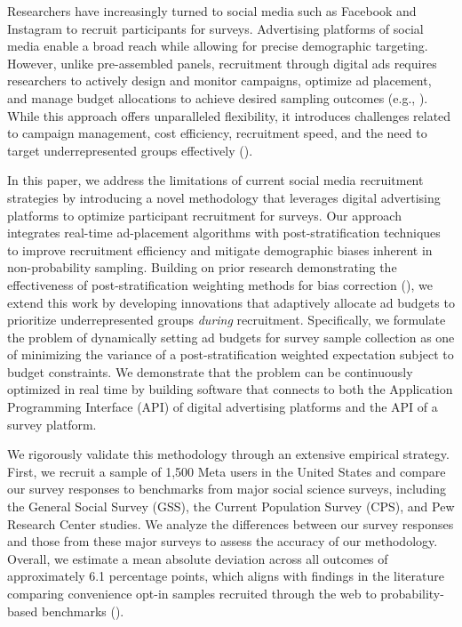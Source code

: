 Researchers have increasingly turned to social media such as Facebook and Instagram to recruit participants for surveys. Advertising platforms of social media enable a broad reach while allowing for precise demographic targeting. However, unlike pre-assembled panels, recruitment through digital ads requires researchers to actively design and monitor campaigns, optimize ad placement, and manage budget allocations to achieve desired sampling outcomes (e.g., \citealt{zhang2020quota}). While this approach offers unparalleled flexibility, it introduces challenges related to campaign management, cost efficiency, recruitment speed, and the need to target underrepresented groups effectively (\citealt{donati2024can, aridor2024experiments}).

In this paper, we address the limitations of current social media recruitment strategies by introducing a novel methodology that leverages digital advertising platforms to optimize participant recruitment for surveys. Our approach integrates real-time ad-placement algorithms with post-stratification techniques to improve recruitment efficiency and mitigate demographic biases inherent in non-probability sampling. Building on prior research demonstrating the effectiveness of post-stratification weighting methods for bias correction (\citealt{deville1992calibration,Gelman1997}), we extend this work by developing innovations that adaptively allocate ad budgets to prioritize underrepresented groups \textit{during} recruitment. Specifically, we formulate the problem of dynamically setting ad budgets for survey sample collection as one of minimizing the variance of a post-stratification weighted expectation subject to budget constraints. We demonstrate that the problem can be continuously optimized in real time by building software that connects to both the Application Programming Interface (API) of digital advertising platforms and the API of a survey platform.

We rigorously validate this methodology through an extensive empirical strategy. First, we recruit a sample of 1,500 Meta users in the United States and compare our survey responses to benchmarks from major social science surveys, including the General Social Survey (GSS), the Current Population Survey (CPS), and Pew Research Center studies. We analyze the differences between our survey responses and those from these major surveys to assess the accuracy of our methodology. Overall, we estimate a mean absolute deviation across all outcomes of approximately 6.1 percentage points, which aligns with findings in the literature comparing convenience opt-in samples recruited through the web to probability-based benchmarks (\citealt{goel2015non, mercer2017weighting}).

